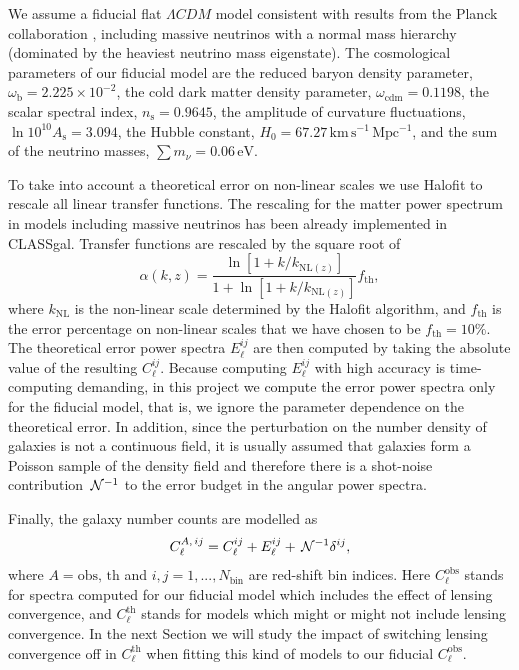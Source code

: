 We assume a fiducial flat $\Lambda CDM$ model consistent with results from the Planck collaboration \cite{Ade:2015xua}, including massive neutrinos with a normal mass hierarchy (dominated by the heaviest neutrino mass eigenstate). The cosmological parameters of our fiducial model are the reduced baryon density parameter, $\omega_{\mathrm{b}} = 2.225\times 10^{-2}$, the cold dark matter density parameter, $\omega_{\mathrm{cdm}}=0.1198$, the scalar spectral index, $n_{\mathrm{s}}=0.9645$, the amplitude of curvature fluctuations, $\ln 10^{10} A_{\mathrm{s}}=3.094$, the Hubble constant, $H_0 = 67.27\, \mathrm{km\, s^{-1}\, Mpc^{-1}}$, and the sum of the neutrino masses, $\sum m_\nu = 0.06\, \mathrm{eV}$.  
     
To take into account a theoretical error on non-linear scales we use Halofit \cite{Smith:2002dz} to rescale all linear transfer functions. The rescaling for the matter power spectrum in models including massive neutrinos has been already implemented in CLASSgal. Transfer functions are rescaled by the square root of 
\begin{equation}
\alpha(k,z) = \frac{\ln [1 + k/k_{\mathrm{NL}(z)}]}{1 + \ln [1 + k/k_{\mathrm{NL}(z)}]}f_{\mathrm{th}},
\label{Eq:rescaling-factor-transfer-functions}
\end{equation}
where $k_{\mathrm{NL}}$ is the non-linear scale determined by the Halofit algorithm, and $f_{\mathrm{th}}$ is the error percentage on non-linear scales that we have chosen to be $f_{\mathrm{th}}=10\%$. The theoretical error power spectra $E_\ell^{ij}$ are then computed by taking the absolute value of the resulting $C_\ell^{ij}$. Because computing $E_\ell^{ij}$ with high accuracy is time-computing demanding, in this project we compute the error power spectra only for the fiducial model, that is, we ignore the parameter dependence on the theoretical error. In addition, since the  perturbation on the number density of galaxies is not a continuous field, it is usually assumed that galaxies form a Poisson sample of the density field \cite{Feldman:1993ky} and therefore there is a shot-noise contribution $\,{\mathcal N}^{-1}$ to the error budget in the angular power spectra.

Finally, the galaxy number counts are modelled as 
\begin{equation}
\label{Eq:GNC-modelled-angular-power-spectra}
C_\ell^{A,\,ij} = C_\ell^{ij} + E_\ell^{ij} + \,{\mathcal N}^{-1} \delta^{ij},
\end{equation}
where $A=\mathrm{obs},\,\mathrm{th}$ and $i,j = 1,...,N_{\mathrm{bin}}$ are red-shift bin indices. Here $C_\ell^{\mathrm{obs}}$ stands for spectra computed for our fiducial model which includes the effect of lensing convergence, and $C_\ell^{\mathrm{th}}$ stands for models which might or might not include lensing convergence. In the next Section we will study the impact of switching lensing convergence off in $C_\ell^{\mathrm{th}}$ when fitting this kind of models to our fiducial $C_\ell^{\mathrm{obs}}$.   
     
